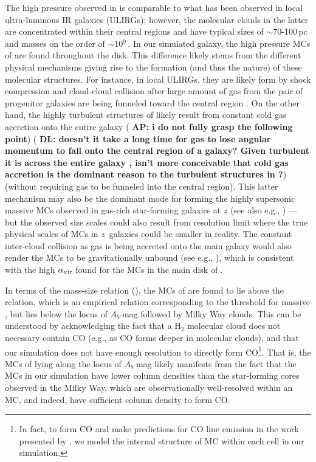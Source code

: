\IfFileExists{emulateapjlegacy.cls}{\documentclass[iop]{emulateapjlegacy}}{\documentclass[iop]{emulateapj}}
\newcommand{\AP}[1]{({\bf \color{apcolor} AP: #1})}
\newcommand{\DL}[1]{({\bf \color{dlcolor} DL: #1})}
\begin{document}
The high pressure observed in \flower is comparable to what has been observed in local ultra-luminous IR galaxies (ULIRGs); however, the molecular clouds in the latter are concentrated within their central regions and have typical sizes of $\sim$70-100\,pc and masses on the order of $\sim$10$^9$\,\Msun \citep{Downes98a, Sakamoto08a}. In our simulated galaxy, the high pressure MCs of \flower are found throughout the disk. This difference likely stems from the different physical mechanisms giving rise to the formation (and thus the nature) of these molecular structures.
%
For instance, in local ULIRGs, they are likely form by shock compression and cloud-cloud collision after large amount of gas from the pair of progenitor galaxies are being funneled toward the central region \citep{Tan00a, Wu18a}.
On the other hand, the highly turbulent structures of \flower likely result from constant cold gas accretion onto the entire galaxy \AP{i do not fully grasp the following point} \DL{doesn't it take a long time for gas to lose angular 
momentum to fall onto the central region of a galaxy? Given turbulent it is across the entire galaxy \Fig{sigma}, 
isn't more conceivable that cold gas accretion is the dominant reason to the turbulent structures in \flower?} 
(without requiring gas to be funneled into the central region).
This latter mechanism may also be the dominant mode for forming the highly supersonic massive MCs observed in gas-rich star-forming galaxies at $z$ (see also e.g., \citealt{Swinbank11a}) --- but the observed size scales could also result from resolution limit where the true physical scales of MCs in $z$\, galaxies could be smaller in reality.
%
The constant inter-cloud collision as gas is being accreted onto the main galaxy would also render
the MCs to be gravitationally unbound (see e.g., \citealt{Dobbs11a}), which is
consistent with the high $\alpha_{\rm vir}$ found for the MCs in the main disk of \flower.

In terms of the mass-size relation (), the MCs of \flower are found to lie above the \citet{Kauffmann10c} relation, which is an empirical relation corresponding to the threshold for massive \SF, but lies
below the locus of $A_V$\,mag followed by Milky Way clouds. This can be understood by acknowledging the fact that a H$_2$ molecular cloud does not necessary contain CO (e.g., as CO forms deeper in molecular clouds), and that our simulation does not have enough resolution to directly form CO\footnote{In fact, to form CO and make predictions for CO line emission in the work presented by \citet{Vallini18a}, we model the internal structure of MC within each cell in our simulation.}.
%
That is, the MCs of \flower lying along the locus of $A_V$\,mag likely manifests from the fact that the MCs in our simulation have lower column densities than the star-forming cores observed in the Milky Way, which are observationally well-resolved within an MC, and indeed, have sufficient column density to form CO.
\end{document}
